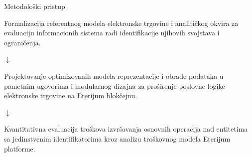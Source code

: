 
\begin{frame}{Metodološki pristup}

\begin{center}

\vspace{-0.5cm}

    
Formalizacija referentnog modela elektronske trgovine i analitičkog okvira za evaluaciju informacionih sistema radi identifikacije njihovih svojstava i ograničenja.

$\downarrow$


Projektovanje optimizovanih modela reprezentacije i obrade podataka u pametnim ugovorima i modularnog dizajna za proširenje poslovne logike elektronske trgovine na Eterijum blokčejnu.

$\downarrow$


Kvantitativna evaluacija troškova izvršavanja osnovnih operacija nad entitetima sa jedinstvenim identifikatorima kroz analizu troškovnog modela Eterijum platforme.

\end{center}

\end{frame}


